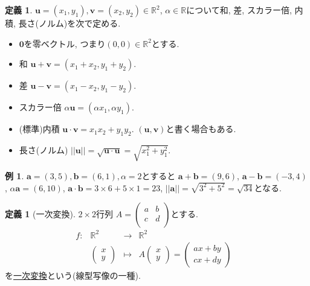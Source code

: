 \documentclass[dvipdfmx,a4paper,11pt]{article}
\newcommand{\R}{\mathbb{R}}
\theoremstyle{definition}
\newtheorem{dfn}[thm]{定義}
\newtheorem{exa}[thm]{例}
\begin{document}
\begin{tcolorbox}[
    colback = white,
    colframe = green!35!black,
    fonttitle = \bfseries,
    breakable = true]
    \begin{dfn}
$\bm{u}=(x_1, y_1), \bm{v}=(x_2, y_2)\in \R^2$, $\alpha \in \R$について和, 差, スカラー倍, 内積, 長さ(ノルム)を次で定める.
\begin{itemize}
	\setlength{\parskip}{0cm}
  	\setlength{\itemsep}{0pt} 
\item $\bm{0}$を零ベクトル, つまり$(0,0) \in \R^2$とする.
\item 和 $\bm{u} + \bm{v} = (x_1 + x_2, y_1+ y_2)$.
\item 差 $\bm{u} - \bm{v} = (x_1 - x_2, y_1 - y_2)$.
\item スカラー倍 $\alpha \bm{u} = (\alpha x_1, \alpha y_1)$.
\item (標準)内積 $\bm{u} \cdot\bm{v} = x_1 x_2 +  y_1 y_2 $. $(\bm{u}, \bm{v})$と書く場合もある. 
\item 長さ(ノルム) $||\bm{u}||= \sqrt{\bm{u} \cdot\bm{u}} = \sqrt{x_{1}^2 +  y_{1}^{2} }$.
\end{itemize}
    \end{dfn}
 \end{tcolorbox}
 
 \begin{exa}
$\bm{a}=(3,5), \bm{b} = (6,1), \alpha=2$とすると
$\bm{a} + \bm{b} =(9,6)$, $\bm{a} - \bm{b} =(-3,4)$, $\alpha \bm{a}= (6,10)$, 
$\bm{a} \cdot\bm{b} = 3 \times 6 + 5 \times 1 =23$, $||\bm{a}||=\sqrt{3^2 + 5^2}= \sqrt{34}$となる.
\end{exa}
 

 
\begin{tcolorbox}[
    colback = white,
    colframe = green!35!black,
    fonttitle = \bfseries,
    breakable = true]
    \begin{dfn}[一次変換]
    $2 \times 2$行列
$
A=\begin{pmatrix}
a& b \\
c& d \\
\end{pmatrix}
$とする. 
 $$
\begin{array}{ccccc}
f: &\R^2& \rightarrow & \R^2& \\
&\begin{pmatrix}
x \\ y
 \end{pmatrix} & \longmapsto & 
A
\begin{pmatrix}
x \\ y
 \end{pmatrix}  = 
 \begin{pmatrix}
ax + by \\ cx + dy
 \end{pmatrix}
 &
\end{array}
$$
を\underline{一次変換}という(線型写像の一種).
\end{dfn}
 \end{tcolorbox}
 
\end{document}

